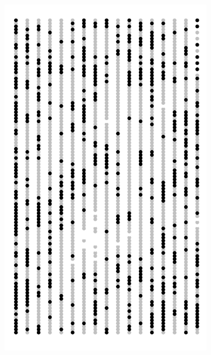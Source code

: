 \documentclass{uwstat572}
\begin{document}
\begin{figure}[!b]
\begin{subfigure}[b]{0.24\textwidth}
		\includegraphics[width=\textwidth]{figures/figure_5b.png}
		\caption{}
		\label{fig:week_40}
	\end{subfigure}
	\hfill
	\begin{subfigure}[b]{0.24\textwidth}

\end{subfigure}
\end{figure}
\end{document}
